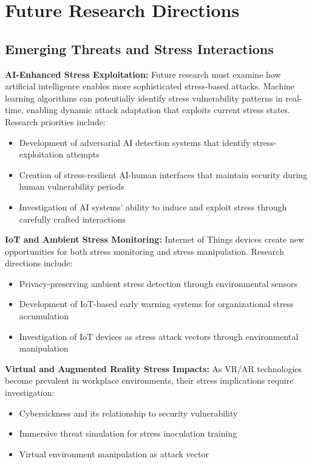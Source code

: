 \documentclass[11pt,a4paper]{article}
\begin{document}
\section{Future Research Directions}

\subsection{Emerging Threats and Stress Interactions}

\textbf{AI-Enhanced Stress Exploitation:}
Future research must examine how artificial intelligence enables more sophisticated stress-based attacks. Machine learning algorithms can potentially identify stress vulnerability patterns in real-time, enabling dynamic attack adaptation that exploits current stress states. Research priorities include:
\begin{itemize}
\item Development of adversarial AI detection systems that identify stress-exploitation attempts
\item Creation of stress-resilient AI-human interfaces that maintain security during human vulnerability periods
\item Investigation of AI systems' ability to induce and exploit stress through carefully crafted interactions
\end{itemize}

\textbf{IoT and Ambient Stress Monitoring:}
Internet of Things devices create new opportunities for both stress monitoring and stress manipulation. Research directions include:
\begin{itemize}
\item Privacy-preserving ambient stress detection through environmental sensors
\item Development of IoT-based early warning systems for organizational stress accumulation
\item Investigation of IoT devices as stress attack vectors through environmental manipulation
\end{itemize}

\textbf{Virtual and Augmented Reality Stress Impacts:}
As VR/AR technologies become prevalent in workplace environments, their stress implications require investigation:
\begin{itemize}
\item Cybersickness and its relationship to security vulnerability
\item Immersive threat simulation for stress inoculation training
\item Virtual environment manipulation as attack vector
\end{itemize}
\end{document}
